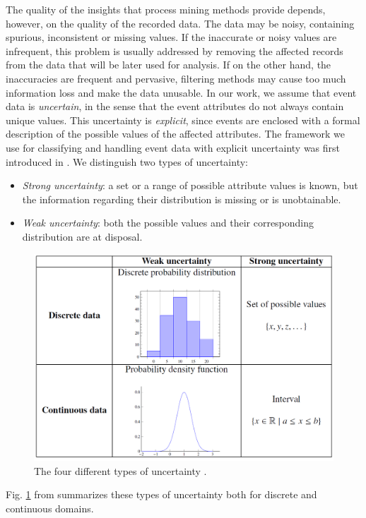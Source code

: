 The quality of the insights that process mining methods provide depends, however, on the quality of the recorded data.
The data may be noisy, containing spurious, inconsistent or missing values.
If the inaccurate or noisy values are infrequent, this problem is usually addressed by removing the affected records from the data that will be later used for analysis.
If on the other hand, the inaccuracies are frequent and pervasive, filtering methods may cause too much information loss and make the data unusable.
In our work, we assume that event data is \textit{uncertain}, in the sense that the event attributes do not always contain unique values.
This uncertainty is \textit{explicit}, since events are enclosed with a formal description of the possible values of the affected attributes.
The framework we use for classifying and handling event data with explicit uncertainty was first introduced in \cite{mining}.
We distinguish two types of uncertainty:
\begin{itemize}
\item \textit{Strong uncertainty}: a set or a range of possible attribute values is known, but the information regarding their distribution is missing or is unobtainable. 
\item \textit{Weak uncertainty}: both the possible values and their corresponding distribution are at disposal.
\end{itemize}
%
%
%
%
%
\begin{figure}[htp]
  \centering
 \includegraphics[width=12cm]{figures/unctypes.png}
	\caption{The four different types of uncertainty \cite{conformance}.}
	\label{fig: uncertainty types}
\end{figure}
%
%
%
%
%
Fig. \ref{fig: uncertainty types} from \cite{conformance} summarizes these types of uncertainty both for discrete and continuous domains.
